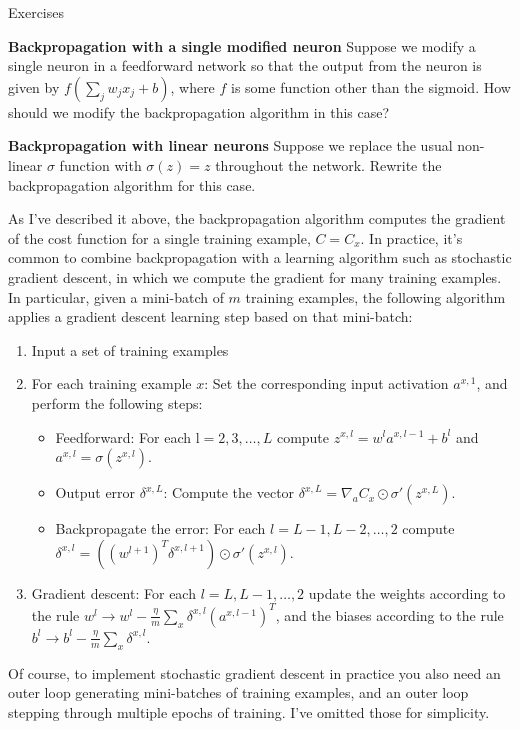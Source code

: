 \documentclass[a4paper,twoside,10pt]{book}
\begin{document}
\begin{exercize}{Exercises}
	\item \textbf{Backpropagation with a single modified neuron} Suppose we modify a single neuron in a feedforward network so that the output from the neuron is given by $f(\sum_j w_j x_j + b)$, where $f$ is some function other than the sigmoid. How should we modify the backpropagation algorithm in this case?
	\item \textbf{Backpropagation with linear neurons} Suppose we replace the usual non-linear $\sigma$ function with $\sigma(z)=z$ throughout the network. Rewrite the backpropagation algorithm for this case.
\end{exercize}
As I've described it above, the backpropagation algorithm computes the gradient of the cost function for a single training example, $C=C_x$. In practice, it's common to combine backpropagation with a learning algorithm such as stochastic gradient descent, in which we compute the gradient for many training examples. In particular, given a mini-batch of $m$ training examples, the following algorithm applies a gradient descent learning step based on that mini-batch:
\begin{enumerate}
\item Input a set of training examples
\item For each training example $x$: Set the corresponding input activation $a^{x,1}$, and perform the following steps:
	\begin{itemize} 
		\item Feedforward: For each l$=2,3,\ldots,L$ compute $z^{x,l}=w^la^{x,l-1}+b^l$ and $a^{x,l}=\sigma(z^{x,l})$.
		\item Output error $\delta^{x,L}$: Compute the vector $\delta^{x,L} = \nabla_a C_x \odot \sigma'(z^{x,L})$.
		\item Backpropagate the error: For each $l=L-1,L-2,\ldots,2$ compute $\delta^{x,l} = ((w^{l+1})^T \delta^{x,l+1}) \odot \sigma'(z^{x,l})$.
	\end{itemize}
\item Gradient descent: For each $l=L,L-1,\ldots,2$ update the weights according to the rule $w^l \to
w^l-\frac{\eta}{m} \sum_x \delta^{x,l} (a^{x,l-1})^T$, and the biases according to the rule $b^l \to b^l-\frac{\eta}{m}\sum_x \delta^{x,l}$.
\end{enumerate}
Of course, to implement stochastic gradient descent in practice you also need an outer loop generating mini-batches of training examples, and an outer loop stepping through multiple epochs of training. I've omitted those for simplicity.
\end{document}
